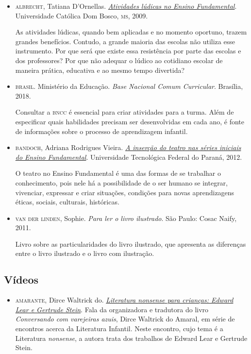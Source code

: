 \documentclass[11pt]{extarticle}
\begin{document}
\begin{itemize}

	\item \textsc{albrecht}, Tatiana D'Ornellas. \href{https://site.ucdb.br/public/md-dissertacoes/8072-atividades-ludicas-no-ensino-fundamental-uma-intervencao-pedagogica.pdf}{\textit{Atividades lúdicas no Ensino Fundamental}}. Universidade Católica Dom Bosco, \textsc{ms}, 2009. 

	As atividades lúdicas, quando bem aplicadas e no momento oportuno, trazem
grandes benefícios. Contudo, a grande maioria das escolas não utiliza esse instrumento. Por
que será que existe essa resistência por parte das escolas e dos professores? Por que não
adequar o lúdico ao cotidiano escolar de maneira prática, educativa e ao mesmo tempo
divertida?

\item \textsc{brasil}. Ministério da Educação. \textit{Base Nacional Comum Curricular}. Brasília, 2018.

Consultar a \textsc{bncc} é essencial para criar atividades para a turma. Além de especificar 
quais habilidades precisam ser desenvolvidas em cada ano, é fonte de informações sobre 
o processo de aprendizagem infantil. 

 \item \textsc{bandoch}, Adriana Rodrigues Vieira. \href{http://repositorio.utfpr.edu.br/jspui/bitstream/1/20738/2/MD_EDUMTE_II_2012_03.pdf}{\textit{A inserção do teatro nas séries iniciais do Ensino Fundamental}}.
 Universidade Tecnológica Federal do Paraná, 2012. 

	O teatro no Ensino Fundamental é uma das formas de se trabalhar o conhecimento,
pois nele há a possibilidade de o ser humano se integrar, vivenciar, expressar e
criar situações, condições para novas aprendizagens éticas, sociais, culturais,
históricas.


\item \textsc{van der linden}, Sophie. \textit{Para ler o livro ilustrado}. São Paulo: Cosac Naify, 2011.

Livro sobre as particularidades do livro ilustrado, que apresenta as diferenças entre o livro ilustrado e o livro com ilustração. 
\end{itemize}

\subsection{Vídeos}

\begin{itemize}

\item \textsc{amarante}, Dirce Waltrick do. \href{https://www.youtube.com/watch?v=2hhvZFCfLlg}{\textit{Literatura \emph{nonsense} para crianças: Edward Lear e
Gertrude Stein}}. 
Fala da organizadora e tradutora do livro \textit{Conversando com varejeiras azuis}, Dirce Waltrick do Amaral,
em série de encontros acerca da Literatura Infantil. Neste encontro, cujo tema é a Literatura \emph{nonsense},
a autora trata dos trabalhos de Edward Lear e Gertrude Stein.

\end{itemize}
\end{document}
